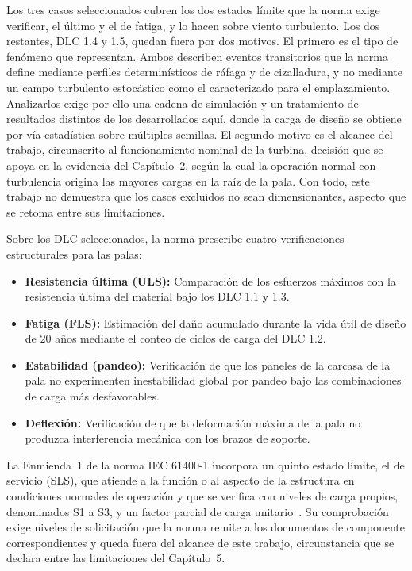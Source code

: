 Los tres casos seleccionados cubren los dos estados límite que la norma exige verificar, el último y el de fatiga, y lo hacen sobre viento turbulento. Los dos restantes, DLC 1.4 y 1.5, quedan fuera por dos motivos. El primero es el tipo de fenómeno que representan. Ambos describen eventos transitorios que la norma define mediante perfiles determinísticos de ráfaga y de cizalladura, y no mediante un campo turbulento estocástico como el caracterizado para el emplazamiento. Analizarlos exige por ello una cadena de simulación y un tratamiento de resultados distintos de los desarrollados aquí, donde la carga de diseño se obtiene por vía estadística sobre múltiples semillas. El segundo motivo es el alcance del trabajo, circunscrito al funcionamiento nominal de la turbina, decisión que se apoya en la evidencia del Capítulo~2, según la cual la operación normal con turbulencia origina las mayores cargas en la raíz de la pala. Con todo, este trabajo no demuestra que los casos excluidos no sean dimensionantes, aspecto que se retoma entre sus limitaciones.

Sobre los DLC seleccionados, la norma prescribe cuatro verificaciones estructurales para las palas:

\begin{itemize}
    \item \textbf{Resistencia última (ULS):} Comparación de los esfuerzos máximos con la resistencia última del material bajo los DLC 1.1 y 1.3.
    \item \textbf{Fatiga (FLS):} Estimación del daño acumulado durante la vida útil de diseño de $20$ años mediante el conteo de ciclos de carga del DLC 1.2.
    \item \textbf{Estabilidad (pandeo):} Verificación de que los paneles de la carcasa de la pala no experimenten inestabilidad global por pandeo bajo las combinaciones de carga más desfavorables.
    \item \textbf{Deflexión:} Verificación de que la deformación máxima de la pala no produzca interferencia mecánica con los brazos de soporte.
\end{itemize}

La Enmienda~1 de la norma IEC 61400-1 incorpora un quinto estado límite, el de servicio (SLS), que atiende a la función o al aspecto de la estructura en condiciones normales de operación y que se verifica con niveles de carga propios, denominados S1 a S3, y un factor parcial de carga unitario~\parencite*{IEC61400-1-AMD1}. Su comprobación exige niveles de solicitación que la norma remite a los documentos de componente correspondientes y queda fuera del alcance de este trabajo, circunstancia que se declara entre las limitaciones del Capítulo~5.

